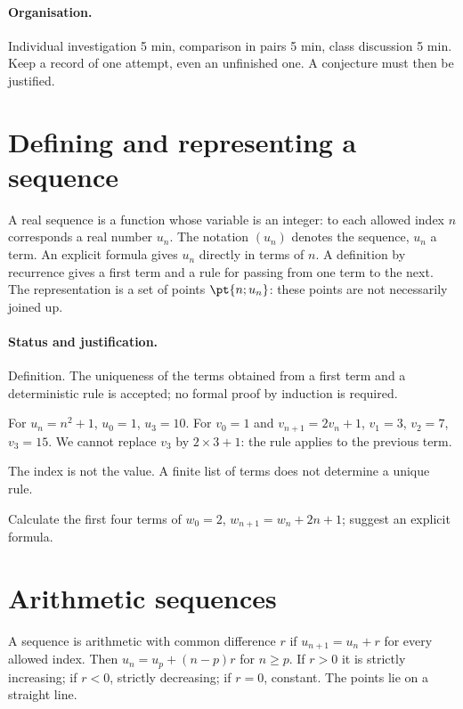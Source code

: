 \paragraph{Organisation.} Individual investigation 5 min, comparison in pairs 5 min, class discussion 5 min. Keep a record of one attempt, even an unfinished one. A conjecture must then be justified.
\mxnewpage
\section{Defining and representing a sequence}\label{C01-U1}
\begin{keypoint}
A real sequence is a function whose variable is an integer: to each allowed index $n$ corresponds a real number $u_n$. The notation $(u_n)$ denotes the sequence, $u_n$ a term. An explicit formula gives $u_n$ directly in terms of $n$. A definition by recurrence gives a first term and a rule for passing from one term to the next. The representation is a set of points $\pt{n;u_n}$: these points are not necessarily joined up.
\end{keypoint}
\paragraph{Status and justification.} Definition. The uniqueness of the terms obtained from a first term and a deterministic rule is accepted; no formal proof by induction is required.
\begin{example}For $u_n=n^2+1$, $u_0=1$, $u_3=10$. For $v_0=1$ and $v_{n+1}=2v_n+1$, $v_1=3$, $v_2=7$, $v_3=15$. We cannot replace $v_3$ by $2\times3+1$: the rule applies to the previous term.\end{example}\label{C01-EX1}
\begin{pitfall}The index is not the value. A finite list of terms does not determine a unique rule.\end{pitfall}
\begin{application}Calculate the first four terms of $w_0=2$, $w_{n+1}=w_n+2n+1$; suggest an explicit formula.\end{application}\label{C01-AP1}
\section{Arithmetic sequences}\label{C01-U2}
\begin{keypoint}
A sequence is arithmetic with common difference $r$ if $u_{n+1}=u_n+r$ for every allowed index. Then $u_n=u_p+(n-p)r$ for $n\geq p$. If $r>0$ it is strictly increasing; if $r<0$, strictly decreasing; if $r=0$, constant. The points lie on a straight line.
\end{keypoint}
